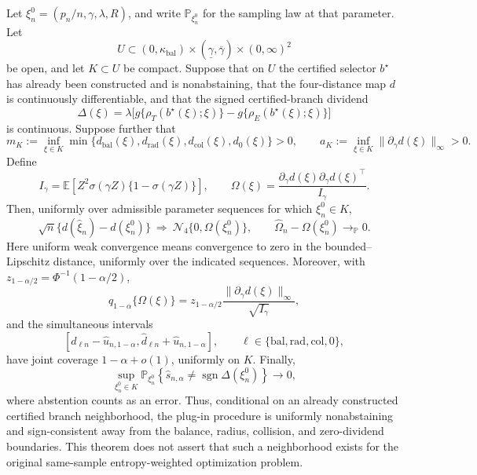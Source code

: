 Let \(\xi_n^0=(p_n/n,\gamma,\lambda,R)\), and write \(\mathbb P_{\xi_n^0}\) for the sampling law at that parameter.  Let
\[
 U\subset (0,\kappa_{\mathrm{bal}})\times
 (\underline\gamma,\overline\gamma)\times(0,\infty)^2
\]
be open, and let \(K\subset U\) be compact.  Suppose that on \(U\) the certified selector \(b^\star\) has already been constructed and is nonabstaining, that the four-distance map \(d\) is continuously differentiable, and that the signed certified-branch dividend
\[
 \Delta(\xi)=\lambda\bigl[g\{\rho_T(b^\star(\xi);\xi)\}
                    -g\{\rho_E(b^\star(\xi);\xi)\}\bigr]
\]
is continuous.  Suppose further that
\[
 m_K:=\inf_{\xi\in K}
 \min\{d_{\mathrm{bal}}(\xi),d_{\mathrm{rad}}(\xi),
        d_{\mathrm{col}}(\xi),d_0(\xi)\}>0,
 \qquad
 a_K:=\inf_{\xi\in K}\|\partial_\gamma d(\xi)\|_\infty>0.
\]
Define
\[
 I_\gamma=\mathbb E\!\left[Z^2\sigma(\gamma Z)
                       \{1-\sigma(\gamma Z)\}\right],
 \qquad
 \Omega(\xi)=
 \frac{\partial_\gamma d(\xi)\partial_\gamma d(\xi)^\top}{I_\gamma}.
\]
Then, uniformly over admissible parameter sequences for which \(\xi_n^0\in K\),
\[
 \sqrt n\{d(\widehat\xi_n)-d(\xi_n^0)\}
 \ \Rightarrow\ \mathcal N_4\{0,\Omega(\xi_n^0)\},
 \qquad
 \widehat\Omega_n-\Omega(\xi_n^0)\to_{\mathbb P}0.
\]
Here uniform weak convergence means convergence to zero in the bounded--Lipschitz distance, uniformly over the indicated sequences.  Moreover, with \(z_{1-\alpha/2}=\Phi^{-1}(1-\alpha/2)\),
\[
 q_{1-\alpha}\{\Omega(\xi)\}
 =z_{1-\alpha/2}\frac{\|\partial_\gamma d(\xi)\|_\infty}{\sqrt{I_\gamma}},
\]
and the simultaneous intervals
\[
 [\widehat d_{\ell n}-\widehat u_{n,1-\alpha},
   \widehat d_{\ell n}+\widehat u_{n,1-\alpha}],
 \qquad \ell\in\{\mathrm{bal},\mathrm{rad},\mathrm{col},0\},
\]
have joint coverage \(1-\alpha+o(1)\), uniformly on \(K\).  Finally,
\[
 \sup_{\xi_n^0\in K}
 \mathbb P_{\xi_n^0}\!\left\{
   \widehat s_{n,\alpha}\ne\operatorname{sgn}\Delta(\xi_n^0)
 \right\}\longrightarrow0,
\]
where abstention counts as an error.  Thus, conditional on an already constructed certified branch neighborhood, the plug-in procedure is uniformly nonabstaining and sign-consistent away from the balance, radius, collision, and zero-dividend boundaries.  This theorem does not assert that such a neighborhood exists for the original same-sample entropy-weighted optimization problem.

